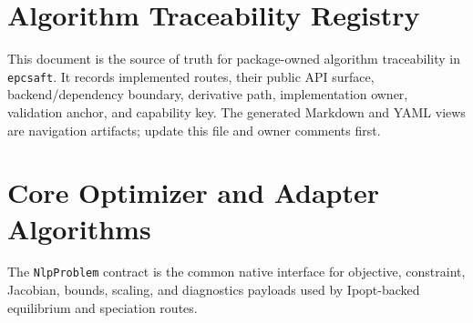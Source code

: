 \documentclass[12pt, letterpaper]{article}
\begin{document}
\section{Algorithm Traceability Registry}

This document is the source of truth for package-owned algorithm traceability in
\texttt{epcsaft}. It records implemented routes, their public API surface,
backend/dependency boundary, derivative path, implementation owner, validation
anchor, and capability key. The generated Markdown and YAML views are navigation
artifacts; update this file and owner comments first.

\section{Core Optimizer and Adapter Algorithms}


The \texttt{NlpProblem} contract is the common native interface for objective,
constraint, Jacobian, bounds, scaling, and diagnostics payloads used by
Ipopt-backed equilibrium and speciation routes.

\end{document}
